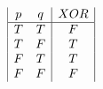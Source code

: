 \begin{displaymath}
    \begin{array}{|c c|c|}
        p & q & XOR \\
        \hline
        T & T & F\\T & F & T\\F & T & T\\F & F & F\\
    \end{array}
\end{displaymath}